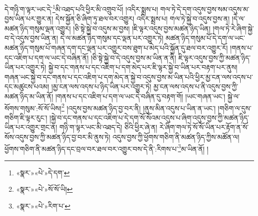 དེ་གཉི་ག་ལྟར་ཡང་དེ་\footnote{«སྣར་»«པེ་»དེ་དག་}མི་འཐད་པའི་ཕྱིར་མི་འགྲུབ་པོ། །འདིར་སྨྲས་པ། གལ་ཏེ་དེ་དག་འདུས་བྱས་སམ་འདུས་མ་བྱས་ཡིན་པར་གྱུར་ན། དེས་སྐྱོན་ཅི་ཞིག་ཏུ་ཐལ་བར་འགྱུར། འདིར་སྨྲས་པ། གལ་ཏེ་སྐྱེ་བ་འདུས་བྱས་ན། །དེ་ལ་མཚན་ཉིད་གསུམ་ལྡན་འགྱུར། །ཅི་སྟེ་སྐྱེ་བ་འདུས་མ་བྱས། །ཇི་ལྟར་འདུས་བྱས་མཚན་ཉིད་ཡིན། །གལ་ཏེ་རེ་ཞིག་སྐྱེ་བ་དེ་འདུས་བྱས་ཡིན་ན། དེ་ལ་མཚན་ཉིད་གསུམ་དང་ལྡན་པར་འགྱུར་ཏེ། མཚན་ཉིད་གསུམ་པོ་དེ་དག་ལ་ཡང་མཚན་ཉིད་གསུམ་པོ་གཞན་དག་དང་ལྡན་པར་འགྱུར་བས་ཐུག་པ་མེད་པའི་སྐྱོན་དུ་ཐལ་བར་འགྱུར་རོ། །གནས་པ་དང་འཇིག་པ་དག་ལ་ཡང་དེ་བཞིན་ནོ། །ཅི་སྟེ་སྐྱེ་བ་དེ་འདུས་བྱས་མ་ཡིན་ན་ནི། ཇི་ལྟར་འདུས་བྱས་ཀྱི་མཚན་ཉིད་ཡིན་པར་འགྱུར་ཏེ། སྐྱེ་བ་དང་གནས་པ་དང་འཇིག་པ་དག་མེད་པར་ཇི་ལྟར་སྐྱེ་བ་ཡིན་པར་བརྟག་པར་ནུས། གཞན་ཡང་སྐྱེ་བ་དང་གནས་པ་དང་འཇིག་པ་དག་མེད་ན་སྐྱེ་བ་འདུས་བྱས་མ་ཡིན་པའི་ཕྱིར་མྱ་ངན་ལས་འདས་པ་དང་མཚུངས་པའམ། །མྱ་ངན་ལས་འདས་པ་ཉིད་ཡིན་པར་འགྱུར་ཏེ། མྱ་ངན་ལས་འདས་པ་ནི་འདུས་བྱས་ཀྱི་མཚན་ཉིད་མ་ཡིན་ནོ། །གནས་པ་དང་འཇིག་པ་དག་ལ་ཡང་དེ་བཞིན་དུ་བརྟག་གོ། །ཡང་གཞན་ཡང་། སྐྱེ་ལ་སོགས་གསུམ་:སོ་སོ་ཡིས།\footnote{«སྣར་»«པེ་»སོ་སོ་ཡི།} །འདུས་བྱས་མཚན་ཉིད་བྱ་བར་ནི། །ནུས་མིན་འདུས་པ་ཡིན་ན་ཡང་། །གཅིག་ལ་དུས་གཅིག་ཇི་ལྟར་རུང་། །སྐྱེ་བ་དང་གནས་པ་དང་འཇིག་པ་དེ་དག་སོ་སོའམ་འདུས་པ་ཞིག་འདུས་བྱས་ཀྱི་མཚན་ཉིད་ཡིན་པར་འགྱུར་གྲང་ན། གཉི་ག་ལྟར་ཡང་མི་འཐད་དེ། ཅིའི་ཕྱིར་ཞེ་ན། རེ་ཞིག་གལ་ཏེ་སོ་སོ་ཡིན་པར་རྟོག་ན་སོ་སོས་འདུས་བྱས་ཀྱི་མཚན་ཉིད་བྱ་བར་མི་ནུས་ཏེ། འདུས་བྱས་ཀྱི་ཕྱོགས་གཅིག་ནི་མཚན་ཉིད་ཀྱིས་མཚོན་ལ། ཕྱོགས་གཅིག་ནི་མཚན་ཉིད་དང་བྲལ་བར་ཐལ་བར་འགྱུར་བས་དེ་ནི་:རིགས་པ་\footnote{«སྣར་»«པེ་»རིག་པ་}མ་ཡིན་ནོ། །
